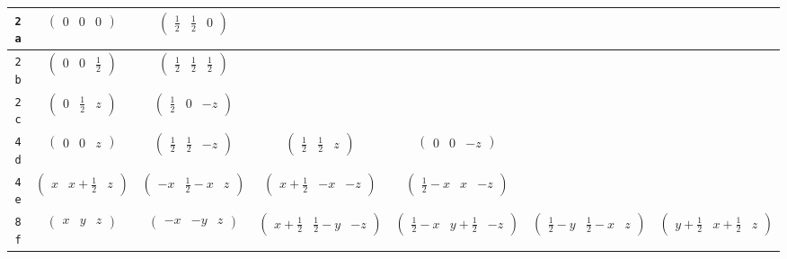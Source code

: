 \documentclass[fleqn,9pt,landscape]{jsarticle}
\begin{document}
\begin{center}
\begin{longtable}{ccccccc}
{\tt 2a} & $ \begin{pmatrix} 0 & 0 & 0 \end{pmatrix} $ & $ \begin{pmatrix} \frac{1}{2} & \frac{1}{2} & 0 \end{pmatrix} $ & $  $ & $  $ & $  $ & $  $ \\ \hline
{\tt 2b} & $ \begin{pmatrix} 0 & 0 & \frac{1}{2} \end{pmatrix} $ & $ \begin{pmatrix} \frac{1}{2} & \frac{1}{2} & \frac{1}{2} \end{pmatrix} $ & $  $ & $  $ & $  $ & $  $ \\ \hline
{\tt 2c} & $ \begin{pmatrix} 0 & \frac{1}{2} & z \end{pmatrix} $ & $ \begin{pmatrix} \frac{1}{2} & 0 & - z \end{pmatrix} $ & $  $ & $  $ & $  $ & $  $ \\ \hline
{\tt 4d} & $ \begin{pmatrix} 0 & 0 & z \end{pmatrix} $ & $ \begin{pmatrix} \frac{1}{2} & \frac{1}{2} & - z \end{pmatrix} $ & $ \begin{pmatrix} \frac{1}{2} & \frac{1}{2} & z \end{pmatrix} $ & $ \begin{pmatrix} 0 & 0 & - z \end{pmatrix} $ & $  $ & $  $ \\ \hline
{\tt 4e} & $ \begin{pmatrix} x & x + \frac{1}{2} & z \end{pmatrix} $ & $ \begin{pmatrix} - x & \frac{1}{2} - x & z \end{pmatrix} $ & $ \begin{pmatrix} x + \frac{1}{2} & - x & - z \end{pmatrix} $ & $ \begin{pmatrix} \frac{1}{2} - x & x & - z \end{pmatrix} $ & $  $ & $  $ \\ \hline
{\tt 8f} & $ \begin{pmatrix} x & y & z \end{pmatrix} $ & $ \begin{pmatrix} - x & - y & z \end{pmatrix} $ & $ \begin{pmatrix} x + \frac{1}{2} & \frac{1}{2} - y & - z \end{pmatrix} $ & $ \begin{pmatrix} \frac{1}{2} - x & y + \frac{1}{2} & - z \end{pmatrix} $ & $ \begin{pmatrix} \frac{1}{2} - y & \frac{1}{2} - x & z \end{pmatrix} $ & $ \begin{pmatrix} y + \frac{1}{2} & x + \frac{1}{2} & z \end{pmatrix} $ \\

\end{longtable}
\end{center}
\end{document}

